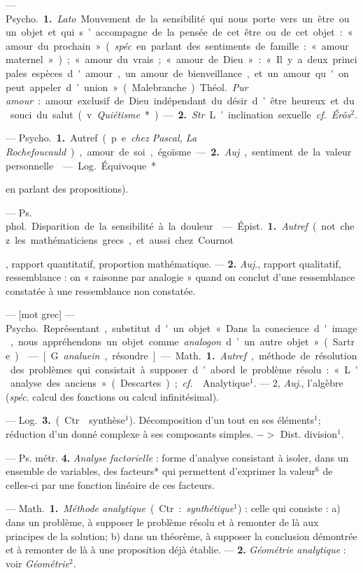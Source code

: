 \begin{itemize}[leftmargin=1cm, label=, itemsep=1pt]
{{{ — \si{Psycho.} {\bf 1.} {\it Lato}.
Mouvement de la sensibilité qui nous porte
vers un être ou un objet et qui s’accompagne de la pensée de cet être
ou de cet objet : « amour du prochain » ({\it spéc}. en parlant des
sentiments de famille : « amour maternel »); « amour du vrais; « amour de
Dieu » : « Il y a deux principales
espèces d'amour, un amour de bienveillance, et un amour qu'on peut
appeler d’union » (Malebranche).
\si{Théol.} {\it Pur amour} : amour exclusif
de Dieu indépendant du désir d’être
heureux et du souci du salut (v.
{\it Quiétisme}*). — {\bf 2.} {\it Str}. L’inclination
sexuelle. {\it cf.}  {\it Érôs}$^2$.

 — \si{Psycho.} {\bf 1.} Autref.
(p. e. {\it chez Pascal, La Rochefoucauld}),
amour de soi, égoïsme. — {\bf 2.} {\it Auj}.,
sentiment de la valeur personnelle.

 — \si{Log.} Équivoque*
{en parlant des propositions).

 — \si{Ps. phol.} Disparition
de la sensibilité à la douleur.

 — \si{Épist.} {\bf 1.} {\it Autref}. (not.
chez les mathématiciens grecs, et
aussi chez Cournot}, rapport quantitatif, proportion mathématique. —
 {\bf 2.} {\it Auj}., rapport qualitatif, ressemblance : on « raisonne par analogie »
quand on conclut d’une ressemblance constatée à une ressemblance
non constatée.

 — [mot grec] — \si{Psycho.} Représentant,
substitut d'un objet
« Dans la conscience d'image, nous
appréhendons un objet comme {\it analogon} d’un autre objet » (Sartre).

 — [G. {\it analuein}, résoudre] —
\si{Math.} {\bf 1.} {\it Autref}., méthode de résolution des problèmes qui consistait
à supposer d’abord le problème résolu : « L'analyse des anciens »
(Descartes) ; {\it cf.}  {\it }Analytique$^1$. — 2,
{\it Auj}., l'algèbre ({\it spéc}. calcul des fonctions ou calcul infinitésimal).

— \si{Log.} {\bf 3.} (Ctr. {\it }synthèse$^1$).
Décomposition d’un tout en ses éléments$^1$; réduction d'un donné
complexe à ses composants simples. $->$ Dist. division$^1$.

— Ps. métr. {\bf 4.} {\it Analyse factorielle} : forme d'analyse consistant à
isoler, dans un ensemble de variables,
des facteurs* qui permettent d’exprimer la valeur$^6$ de celles-ci par une
fonction linéaire de ces facteurs.

 — \si{Math.} {\bf 1.} {\it Méthode analytique} (Ctr. : {\it synthétique}$^1$) : celle
qui consiste : a) dans un problème,
à supposer le problème résolu et à
remonter de là aux principes de la
solution; b) dans un théorème, à
supposer la conclusion démontrée et
à remonter de là à une proposition
déjà établie. — {\bf 2.} {\it Géométrie analytique} : voir {\it Géométrie}$^2$.

}}}
\end{itemize}
